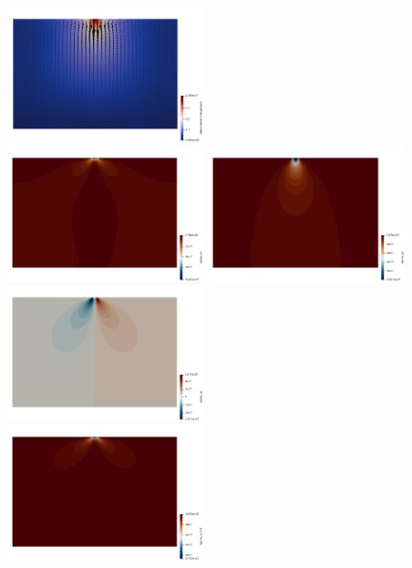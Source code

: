 \begin{center}
\includegraphics[width=5.7cm]{python_codes/fieldstone_34/results/exp4/disp}\\
\includegraphics[width=5.7cm]{python_codes/fieldstone_34/results/exp4/sigma_xx}
\includegraphics[width=5.7cm]{python_codes/fieldstone_34/results/exp4/sigma_yy}
\includegraphics[width=5.7cm]{python_codes/fieldstone_34/results/exp4/sigma_xy}\\
\includegraphics[width=5.7cm]{python_codes/fieldstone_34/results/exp4/sigma_xx_th}

\end{center}
